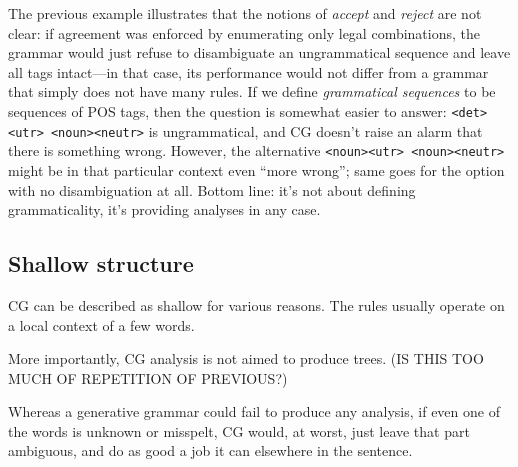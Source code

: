 
The previous example illustrates that the notions of \emph{accept} and \emph{reject} are not clear: if agreement was enforced
by enumerating only legal combinations, the grammar would just refuse to disambiguate
an ungrammatical sequence and leave all tags intact---in that case,
its performance would not differ from a grammar that simply does not have many rules.
If we define \emph{grammatical sequences} to be sequences of POS tags,
then the question is somewhat easier to answer: \texttt{\textless{}det\textgreater{}\textless{}utr\textgreater{} \textless{}noun\textgreater{}\textless{}neutr\textgreater{}} is ungrammatical, and CG doesn't raise an alarm that there is something wrong. However, the alternative \texttt{\textless{}noun\textgreater{}\textless{}utr\textgreater{} \textless{}noun\textgreater{}\textless{}neutr\textgreater{}} might be in that particular context even ``more wrong''; same goes for the option with no disambiguation at all.
Bottom line: it's not about defining grammaticality, it's providing analyses in any case.


\subsection{Shallow structure}\label{shallow-vs.deep-structure}

CG can be described as shallow for various reasons. The rules usually
operate on a local context of a few words. 

More importantly, CG analysis is not aimed to produce trees. (IS THIS TOO MUCH OF REPETITION OF PREVIOUS?)

Whereas a generative grammar could fail to produce any analysis, if even one of the words is unknown or misspelt, CG would, at worst, just leave that part ambiguous, and do as good a job it can elsewhere in the sentence.




